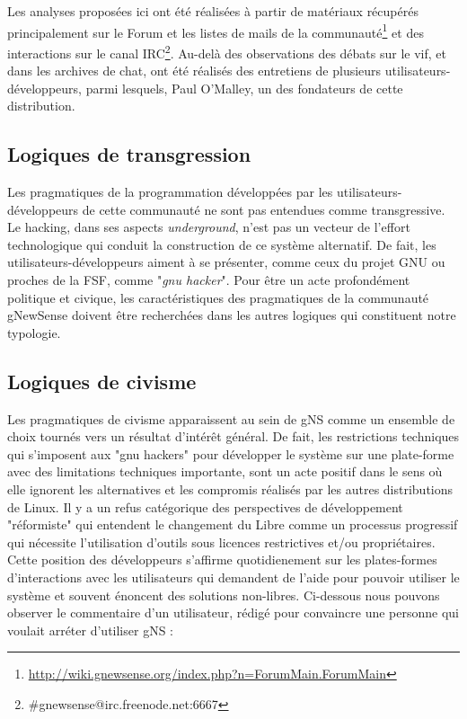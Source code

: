 Les analyses proposées ici ont été réalisées à partir de matériaux récupérés principalement sur le Forum et les listes de mails de la communauté\footnote{\url{http://wiki.gnewsense.org/index.php?n=ForumMain.ForumMain}} et des interactions sur le canal IRC\footnote{\#gnewsense@irc.freenode.net:6667}. Au-delà des observations des débats sur le vif, et dans les archives de chat, ont été réalisés des entretiens de plusieurs utilisateurs-développeurs, parmi lesquels, Paul O'Malley, un des fondateurs de cette distribution.

\subsection{Logiques de transgression} \label{3.1.1}

Les pragmatiques de la programmation développées par les utilisateurs-développeurs de cette communauté ne sont pas entendues comme transgressive. Le hacking, dans ses aspects \emph{underground}, n'est pas un vecteur de l'effort technologique qui conduit la construction de ce système alternatif. De fait, les utilisateurs-développeurs aiment à se présenter, comme ceux du projet GNU ou proches de la FSF, comme "\emph{gnu hacker}". Pour être un acte profondément politique et civique, les caractéristiques des pragmatiques de la communauté gNewSense doivent être recherchées dans les autres logiques qui constituent notre typologie.

\subsection{Logiques de civisme}\label{3.1.2}

Les pragmatiques de civisme apparaissent au sein de gNS comme un ensemble de choix tournés vers un résultat d'intérêt général. De fait, les restrictions techniques qui s'imposent aux "gnu hackers" pour développer le système sur une plate-forme avec des limitations techniques importante, sont un acte positif dans le sens où elle ignorent les alternatives et les compromis réalisés par les autres distributions de Linux. Il y a un refus catégorique des perspectives de développement "réformiste" qui entendent le changement du Libre comme un processus progressif qui nécessite l'utilisation d'outils sous licences restrictives et/ou propriétaires. Cette position des développeurs s'affirme quotidienement sur les plates-formes d'interactions avec les utilisateurs qui demandent de l'aide pour pouvoir utiliser le système et souvent énoncent des solutions non-libres. Ci-dessous nous pouvons observer le commentaire d'un utilisateur, rédigé pour convaincre une personne qui voulait arréter d'utiliser gNS :

